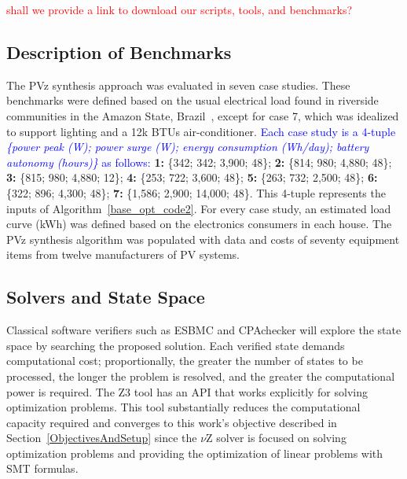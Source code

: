 \documentclass[journal]{IEEEtran}
\begin{document}
\textcolor{red}{shall we provide a link to download our scripts, tools, and benchmarks?}

\subsection{Description of Benchmarks}

The PVz synthesis approach was evaluated in seven case studies. These benchmarks were defined based on the usual electrical load found in riverside communities in the Amazon State, Brazil~\cite{TrindadeCordeiro19,Agrener2013}, except for case 7, which was idealized to support lighting and a 12k BTUs air-conditioner.  
\textcolor{blue}{Each case study is a 4-tuple \textit{\{power peak (W); power surge (W); energy consumption (Wh/day); battery autonomy (hours)\}} as follows:}
  \textbf{1:} \{342; 342; 3,900; 48\}; \textbf{2:} \{814; 980; 4,880; 48\}; \textbf{3:} \{815; 980; 4,880; 12\}; \textbf{4:} \{253; 722; 3,600; 48\}; \textbf{5:} \{263; 732; 2,500; 48\}; \textbf{6:} \{322; 896; 4,300; 48\}; \textbf{7:} \{1,586; 2,900; 14,000; 48\}. This 4-tuple represents the inputs of Algorithm~\ref{base_opt_code2}. For every case study, an estimated load curve (kWh) was defined based on the electronics consumers in each house. The PVz synthesis algorithm was populated with data and costs of seventy equipment items from twelve manufacturers of PV systems. 

\subsection{Solvers and State Space}
\label{sec:SolversandStateSpace}
  Classical software verifiers such as ESBMC and CPAchecker will explore the state space by searching the proposed solution. Each verified state demands computational cost; proportionally, the greater the number of states to be processed, the longer the problem is resolved, and the greater the computational power is required. The Z3 tool has an API that works explicitly for solving optimization problems. This tool substantially reduces the computational capacity required and converges to this work's objective described in Section~\ref{ObjectivesAndSetup} since the $\nu$Z solver is focused on solving optimization problems and providing the optimization of linear problems with SMT formulas.
\end{document}
